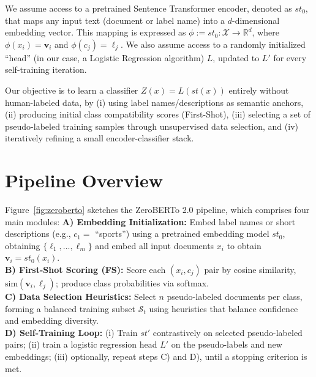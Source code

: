 \documentclass[]{politex-xico}
\begin{document}
We assume access to a pretrained Sentence Transformer encoder, denoted as $st_0$, that maps any input text (document or label name) into a $d$-dimensional embedding vector. This mapping is expressed as $\phi := st_0: \mathcal{X} \rightarrow \mathbb{R}^d$, where $\phi(x_i) = \mathbf{v}_i$ and $\phi(c_j) = \mathbf{\ell}_j$. We also assume access to a randomly initialized ``head'' (in our case, a Logistic Regression algorithm) $L$, updated to $L'$ for every self-training iteration.

Our objective is to learn a classifier $Z(x) = L(st(x))$ entirely without human-labeled data, by (i) using label names/descriptions as semantic anchors, (ii) producing initial class compatibility scores (First-Shot), (iii) selecting a set of pseudo-labeled training samples through unsupervised data selection, and (iv) iteratively refining a small encoder-classifier stack.

\section{Pipeline Overview}
\label{sec:pipeline}


Figure~\ref{fig:zeroberto} sketches the ZeroBERTo 2.0 pipeline, which comprises four main modules: 
\textbf{A) Embedding Initialization:} Embed label names or short descriptions (e.g., $c_1=$ ``sports'') using a pretrained embedding model $st_0$, obtaining $\{\mathbf{\ell}_1, ..., \mathbf{\ell}_m\}$ and embed all input documents $x_i$ to obtain $\mathbf{v}_i = st_0(x_i)$.
\\ \textbf{B) First-Shot Scoring (FS):} Score each $(x_i, c_j)$ pair by cosine similarity, $\text{sim}(\mathbf{v}_i, \mathbf{\ell}_j)$; produce class probabilities via softmax.
\\ \textbf{C) Data Selection Heuristics:} Select $n$ pseudo-labeled documents per class, forming a balanced training subset $\mathcal{S}_t$ using heuristics that balance confidence and embedding diversity.
\\ \textbf{D) Self-Training Loop: }(i) Train $st'$ contrastively on selected pseudo-labeled pairs; (ii) train a logistic regression head $L'$ on the pseudo-labels and new embeddings; (iii) optionally, repeat steps C) and D), until a stopping criterion is met.
\end{document}
